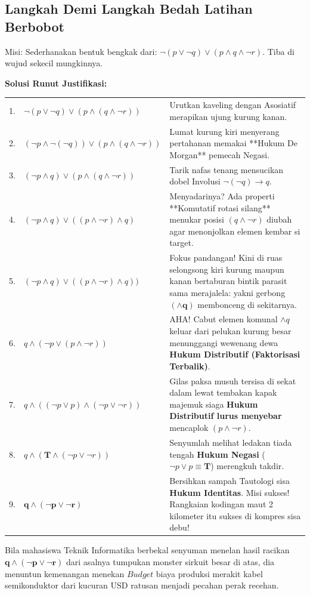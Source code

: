 \subsection{Langkah Demi Langkah Bedah Latihan Berbobot}

\begin{contoh}
Misi: Sederhanakan bentuk bengkak dari: $\neg(p \vee \neg q) \vee (p \wedge q \wedge \neg r)$.  Tiba di wujud sekecil mungkinnya.

\textbf{Solusi Runut Justifikasi:}
\vspace{2mm}
    
\begin{tabular}{p{0.5cm} p{6.5cm} p{7cm}}
    1. & $\neg(p \vee \neg q) \vee (p \wedge (q \wedge \neg r))$ & Urutkan kaveling dengan Asosiatif merapikan ujung kurung kanan. \\ 
    2. & $(\neg p \wedge \neg(\neg q)) \vee (p \wedge (q \wedge \neg r))$ & Lumat kurung kiri menyerang pertahanan memakai **Hukum De Morgan** pemecah Negasi. \\ 
    3. & $(\neg p \wedge q) \vee (p \wedge (q \wedge \neg r))$ & Tarik nafas tenang mensucikan dobel Involusi $\neg(\neg q) \rightarrow q$. \\ 
    4. & $(\neg p \wedge q) \vee ((p \wedge \neg r) \wedge q)$ & Menyadarinya? Ada properti **Komutatif rotasi silang** menukar posisi $(q \wedge \neg r)$ diubah agar menonjolkan elemen kembar si target. \\ 
    5. & $(\neg p \wedge q) \vee ( (p \wedge \neg r) \wedge q) )$ & Fokus pandangan! Kini di ruas selongsong kiri kurung maupun kanan bertaburan bintik parasit sama merajalela: yakni gerbong $\mathbf{(\wedge q)}$ membonceng di sekitarnya. \\
    6. & $q \wedge ( \neg p \vee (p \wedge \neg r) )$ & AHA! Cabut elemen komunal $\wedge q$ keluar dari pelukan kurung besar menunggangi wewenang dewa \textbf{Hukum Distributif (Faktorisasi Terbalik)}. \\ 
    7. & $q \wedge ( (\neg p \vee p) \wedge (\neg p \vee \neg r) )$ & Gilas paksa musuh tersisa di sekat dalam lewat tembakan kapak majemuk siaga \textbf{Hukum Distributif lurus menyebar} mencaplok $(p \wedge \neg r)$. \\
    8. & $q \wedge ( \mathbf{T} \wedge (\neg p \vee \neg r) )$ & Senyumlah melihat ledakan tiada tengah \textbf{Hukum Negasi} ($\neg p \vee p \equiv \mathbf{T}$) merengkuh takdir. \\
    9. & $\mathbf{q \wedge (\neg p \vee \neg r)}$ & Bersihkan sampah Tautologi sisa \textbf{Hukum Identitas}. Misi sukses! Rangkaian kodingan maut 2 kilometer itu sukses di kompres sisa debu!
\end{tabular} 
\vspace{2mm}

Bila mahasiswa Teknik Informatika berbekal senyuman menelan hasil racikan $\mathbf{q \wedge (\neg p \vee \neg r)}$ dari asalnya tumpukan monster sirkuit besar di atas, dia menuntun kemenangan menekan $Budget$ biaya produksi merakit kabel semikonduktor dari kucuran USD ratusan menjadi pecahan perak recehan.
\end{contoh}
